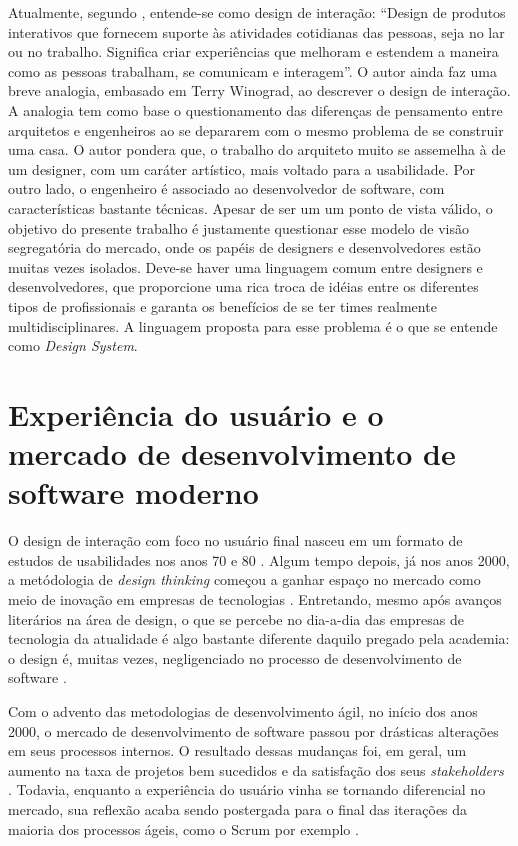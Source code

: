 Atualmente, segundo \cite{preece2005design}, entende-se como design de interação:
“Design de produtos interativos que fornecem suporte às atividades cotidianas das pessoas, seja no lar ou no trabalho. Significa criar experiências que melhoram e estendem a maneira como as pessoas trabalham, se comunicam e interagem”. 
O autor ainda faz uma breve analogia, embasado em Terry Winograd, ao descrever o design de interação. A analogia tem como base o questionamento das diferenças de pensamento entre arquitetos e engenheiros ao se depararem com o mesmo problema de se construir uma casa. O autor pondera que, o trabalho do arquiteto muito se assemelha à de um designer, com um caráter artístico, mais voltado para a usabilidade. Por outro lado, o engenheiro é associado ao desenvolvedor de software, com características bastante técnicas. Apesar de ser um um ponto de vista válido, o objetivo do presente trabalho é justamente questionar esse modelo de visão segregatória do mercado, onde os papéis de designers e desenvolvedores estão muitas vezes isolados. Deve-se haver uma linguagem comum entre designers e desenvolvedores, que proporcione uma rica troca de idéias entre os diferentes tipos de profissionais e garanta os benefícios de se ter times realmente multidisciplinares. A linguagem proposta para esse problema é o que se entende como \textit{Design System}.

\section{Experiência do usuário e o mercado de desenvolvimento de software moderno}
\label{experienciaUsuarioMercado}

O design de interação com foco no usuário final nasceu em um formato de estudos de usabilidades nos anos 70 e 80 \cite{gould1985designing, nielsen1994usability}. Algum tempo depois, já nos anos 2000, a metódologia de \textit{design thinking} começou a ganhar espaço no mercado como meio de inovação em empresas de tecnologias \cite{martin2009design}. Entretando, mesmo após avanços literários na área de design, o que se percebe no dia-a-dia das empresas de tecnologia da atualidade é algo bastante diferente daquilo pregado pela academia:  o design é, muitas vezes, negligenciado no processo de desenvolvimento de software \cite{winograd1996bringing}.

Com o advento das metodologias de desenvolvimento ágil, no início dos anos 2000, o mercado de desenvolvimento de software passou por drásticas alterações em seus processos internos. O resultado dessas mudanças foi, em geral, um aumento na taxa de projetos bem sucedidos e da satisfação dos seus \textit{stakeholders} \cite{serrador2015does}. Todavia, enquanto a experiência do usuário vinha se tornando diferencial no mercado, sua reflexão acaba sendo postergada para o final das iterações da maioria dos processos ágeis, como o Scrum por exemplo \cite{ruissalo2018operating}.

